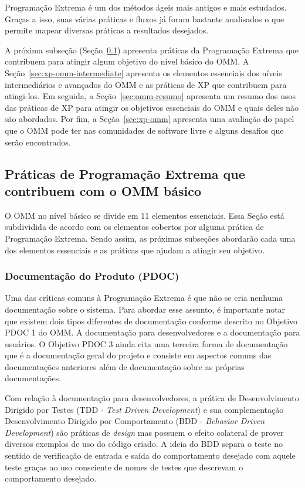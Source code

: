Programação Extrema é um dos métodos ágeis mais antigos e mais
estudados. Graças a isso, suas várias práticas e fluxos já foram
bastante analisados o que permite mapear diversas práticas a
resultados desejados.

A próxima subseção (Seção~\ref{sec:xp+omm}) apresenta práticas da
Programação Extrema que contribuem para atingir algum objetivo do
nível básico do OMM. A Seção~\ref{sec:xp-omm-intermediate} apresenta
os elementos essenciais dos níveis intermediários e avançados do OMM e
as práticas de XP que contribuem para atingi-los.  Em seguida, a
Seção~\ref{sec:omm-resumo} apresenta um resumo dos usos das práticas
de XP para atingir os objetivos essenciais do OMM e quais deles não
são abordados. Por fim, a Seção~\ref{sec:xp-omm} apresenta uma
avaliação do papel que o OMM pode ter nas comunidades de software
livre e alguns desafios que serão encontrados.

\subsection{Práticas de Programação Extrema que contribuem com o OMM
  básico}
\label{sec:xp+omm}

O OMM no nível básico se divide em 11 elementos essenciais. Essa Seção
está subdividida de acordo com os elementos cobertos por alguma
prática de Programação Extrema. Sendo assim, as próximas subseções
abordarão cada uma dos elementos essenciais e as práticas que ajudam a
atingir seu objetivo.

\subsubsection{Documentação do Produto (PDOC)}
\label{sec:+pdoc}

Uma das críticas comuns à Programação Extrema é que não se cria
nenhuma documentação sobre o sistema. Para abordar esse assunto, é
importante notar que existem dois tipos diferentes de documentação
conforme descrito no Objetivo PDOC 1 do OMM. A documentação para
desenvolvedores e a documentação para usuários. O Objetivo PDOC 3
ainda cita uma terceira forma de documentação que é a documentação
geral do projeto e consiste em aspectos comuns das documentações
anteriores além de documentação sobre as próprias documentações.

Com relação à documentação para desenvolvedores, a prática de
Desenvolvimento Dirigido por Testes (TDD - \textit{Test Driven
  Development}) e sua complementação Desenvolvimento Dirigido por
Comportamento (BDD - \textit{Behavior Driven Development}) são
práticas de \textit{design} mas possuem o efeito colateral de prover
diversos exemplos de uso do código criado. A ideia do BDD separa o
teste no sentido de verificação de entrada e saída do comportamento
desejado com aquele teste graças ao uso consciente de nomes de testes
que descrevam o comportamento desejado.

